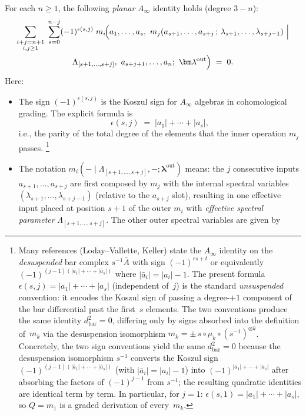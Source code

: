 \begin{definition}
\label{def:ainfty-relations}
For each $n\ge 1$, the following \emph{planar} $A_\infty$ identity holds (degree $3-n$):
\begin{multline}
\label{eq:ainfty-relation-raw}
\sum_{\substack{i+j=n+1\\ i,j\ge1}}\;\sum_{s=0}^{n-j}
(-1)^{\epsilon(s,j)}\;
m_i\!\Bigl(
a_1,\dots,a_s,\
m_j(a_{s+1},\dots,a_{s+j}\,;\,\lambda_{s+1},\dots,\lambda_{s+j-1})
\ \Big|\\
\Lambda_{[s+1,\dots,s+j]}
,\ a_{s+j+1},\dots,a_n;\ \bm\lambda^{\mathrm{out}} \Bigr)
\;=\;0.
\end{multline}
Here:
\begin{itemize}
 \item The sign $(-1)^{\epsilon(s,j)}$ is the Koszul sign for $A_\infty$ algebras in cohomological grading. The explicit formula is
 \[
 \epsilon(s,j) \;=\; |a_1|+\cdots+|a_s|,
 \]
 i.e., the parity of the total degree of the elements that the inner operation $m_j$ passes.%
 \footnote{Many references (Loday--Vallette, Keller) state the $A_\infty$
 identity on the \emph{desuspended} bar complex $s^{-1}\bar A$ with sign
 $(-1)^{rs+t}$ or equivalently
 $(-1)^{(j-1)(|\bar a_1|+\cdots+|\bar a_s|)}$ where
 $|\bar a_i|=|a_i|-1$. The present formula $\epsilon(s,j)=|a_1|+\cdots+|a_s|$
 (independent of~$j$) is the standard \emph{unsuspended} convention: it
 encodes the Koszul sign of passing a degree-$+1$ component of the bar
 differential past the first~$s$ elements. The two conventions produce
 the same identity $d_{\mathrm{bar}}^2=0$, differing only by signs absorbed
 into the definition of~$m_k$ via the desuspension isomorphism
 $m_k = \pm\, s\circ \mu_k\circ(s^{-1})^{\otimes k}$.
 Concretely, the two sign conventions yield the same
 $d_{\mathrm{bar}}^2 = 0$ because the desuspension isomorphism
 $s^{-1}$ converts the Koszul sign
 $(-1)^{(j-1)(|\bar a_1|+\cdots+|\bar a_s|)}$ (with $|\bar a_i| = |a_i|-1$)
 into $(-1)^{|a_1|+\cdots+|a_s|}$ after absorbing the factors of
 $(-1)^{j-1}$ from $s^{-1}$; the resulting quadratic identities are
 identical term by term.
 In particular, for $j=1$: $\epsilon(s,1)=|a_1|+\cdots+|a_s|$,
 so $Q=m_1$ is a graded derivation of every~$m_k$.}
 \item The notation $m_i(-\mid \Lambda_{[s+1,\dots,s+j]},-;\bm\lambda^{\mathrm{out}})$ means:
 the $j$ consecutive inputs $a_{s+1},\dots,a_{s+j}$ are first composed by $m_j$ with the internal spectral variables $(\lambda_{s+1},\dots,\lambda_{s+j-1})$ (relative to the $a_{s+j}$ slot), resulting in one effective input placed at position $s+1$ of the outer $m_i$ with \emph{effective spectral parameter} $\Lambda_{[s+1,\dots,s+j]}$. The other outer spectral variables are given by

\end{itemize}
\end{definition}
